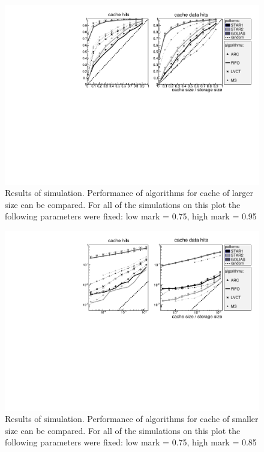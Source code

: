 \documentclass[english]{ddny}
\begin{document}
        \begin{figure}
                \centering
                \includegraphics[width=\textwidth, natwidth=610,natheight=642]{pic/big-basic.pdf}
                \caption{Results of simulation. Performance of algorithms for cache of larger size can be compared. For all of the simulations on this plot the following parameters were fixed: low mark = 0.75, high mark = 0.95 }
                \label{plots:big}
        \end{figure}%

        \begin{figure}
                \centering
                \includegraphics[width=\textwidth, natwidth=610,natheight=642]{pic/tiny-basic.pdf}
                \caption{Results of simulation. Performance of algorithms for cache of smaller size can be compared. For all of the simulations on this plot the following parameters were fixed: low mark = 0.75, high mark = 0.85}
                \label{plots:tiny}
        \end{figure}
\end{document}
